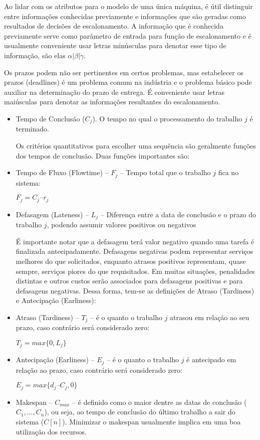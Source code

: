 Ao lidar com os atributos para o modelo de uma única máquina, é  útil distinguir entre informações conhecidas previamente e informações que são geradas como resultados de decisões de escalonamento. A informação que é conhecida previamente serve como parâmetro de entrada para função de escalonamento e é usualmente conveniente usar letras minúsculas para denotar esse tipo de informação, são elas $\alpha | \beta | \gamma$.

Os prazos podem não ser pertinentes em certos problemas, mas estabelecer os prazos (deadlines) é um problema comum na indústria e o problema básico pode auxiliar na determinação do prazo de entrega. É conveniente usar letras maiúsculas para denotar as informações resultantes do escalonamento. 

\begin{itemize}

\item Tempo de Conclusão ($C_j$). O tempo no qual o processamento do trabalho $j$ é terminado. 

Os critérios quantitativos para escolher uma sequência são geralmente funções dos tempos de conclusão. Duas funções importantes são: 

\item Tempo de Fluxo (Flowtime) – $F_j$ – Tempo total que o trabalho $j$ fica no sistema: 

$F_j = C_j – r_j$
 
\item Defasagem (Lateness) – $L_j$ – Diferença entre a data de conclusão e o prazo do trabalho $j$, podendo assumir valores positivos ou negativos

É importante notar que a defasagem terá valor negativo quando uma tarefa é finalizada antecipadamente. Defasagens negativas podem representar serviços melhores do que solicitados, enquanto atrasos positivos representam, quase sempre, serviços piores do que requisitados. Em muitas situações, penalidades distintas e outros custos serão associados para defasagens positivas e para defasagens negativas. Dessa forma, tem-se as definições de Atraso (Tardiness) e Antecipação (Earliness): 

\item Atraso (Tardiness) – $T_j$ – é o quanto o trabalho $j$ atrasou em relação ao seu prazo, caso contrário será considerado zero:
 
$T_j = max\{0, L_j\}$ 

\item Antecipação (Earliness) – $E_j$ – é o quanto o trabalho $j$ é antecipado em relação ao prazo, caso contrário será considerado zero: 
 
$ E_j = max\{d_j – C_j, 0\} $
 
\item Makespan – $C_{max}$ – é definido como o maior dentre as datas de 
conclusão ($C_1, . . ., C_n$), ou seja, ao tempo de conclusão do último trabalho a sair do sistema ($C[n]$). Minimizar o makespan usualmente implica em uma boa utilização dos recursos. 

\end{itemize}


